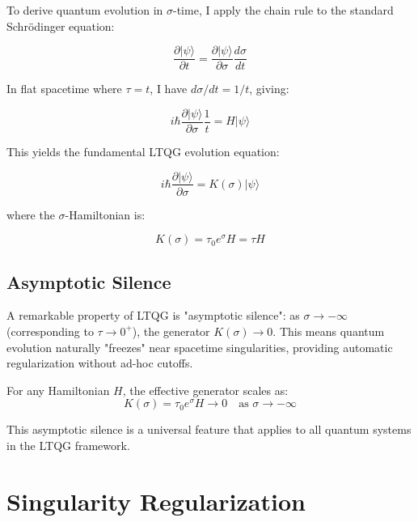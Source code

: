 \documentclass[12pt,a4paper]{article}
\begin{document}
To derive quantum evolution in $\sigma$-time, I apply the chain rule to the standard Schrödinger equation:

\begin{equation}
\frac{\partial |\psi\rangle}{\partial t} = \frac{\partial |\psi\rangle}{\partial \sigma} \frac{d\sigma}{dt}
\end{equation}

In flat spacetime where $\tau = t$, I have $d\sigma/dt = 1/t$, giving:

\begin{equation}
i\hbar \frac{\partial |\psi\rangle}{\partial \sigma} \frac{1}{t} = H |\psi\rangle
\end{equation}

This yields the fundamental LTQG evolution equation:

\begin{equation}
\boxed{i\hbar \frac{\partial |\psi\rangle}{\partial \sigma} = K(\sigma) |\psi\rangle}
\label{eq:ltqg_schrodinger}
\end{equation}

where the $\sigma$-Hamiltonian is:

\begin{equation}
\boxed{K(\sigma) = \tau_0 e^{\sigma} H = \tau H}
\label{eq:sigma_hamiltonian}
\end{equation}

\subsection{Asymptotic Silence}

A remarkable property of LTQG is "asymptotic silence": as $\sigma \to -\infty$ (corresponding to $\tau \to 0^+$), the generator $K(\sigma) \to 0$. This means quantum evolution naturally "freezes" near spacetime singularities, providing automatic regularization without ad-hoc cutoffs.

For any Hamiltonian $H$, the effective generator scales as:
\begin{equation}
K(\sigma) = \tau_0 e^{\sigma} H \to 0 \quad \text{as } \sigma \to -\infty
\label{eq:asymptotic_silence}
\end{equation}

This asymptotic silence is a universal feature that applies to all quantum systems in the LTQG framework.

\section{Singularity Regularization}
\end{document}
